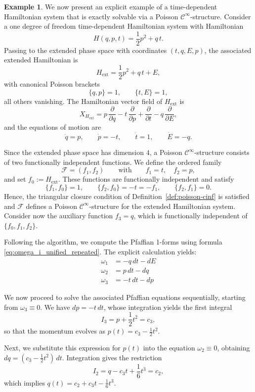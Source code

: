 \documentclass{article}
\theoremstyle{remark}
\theoremstyle{definition}
\newtheorem{example}{Example}[section]
\newcommand{\cinf}{$\mathcal{C}^{\infty}$}
\begin{document}
\begin{example}
We now present an explicit example of a time-dependent Hamiltonian
system that is exactly solvable via a Poisson \cinf-structure. Consider a one degree of freedom time-dependent Hamiltonian system with Hamiltonian
\[
H(q,p,t)=\frac{1}{2}p^2+q\,t.
\]
Passing to the extended phase space with coordinates $(t,q,E,p)$, the
associated extended Hamiltonian is
\[
H_{\mathrm{ext}}=\frac{1}{2}p^2+q\,t+E,
\]
with canonical Poisson brackets
\[
\{q,p\}=1,\qquad \{t,E\}=1,
\]
all others vanishing. The Hamiltonian vector field of $H_{\mathrm{ext}}$ is
\[
X_{H_{\mathrm{ext}}}
=
p\,\frac{\partial}{\partial q}
-
t\,\frac{\partial}{\partial p}
+
\frac{\partial}{\partial t}
-
q\,\frac{\partial}{\partial E},
\]
and the equations of motion are
\[
\dot q=p,\qquad
\dot p=-t,\qquad
\dot t=1,\qquad
\dot E=-q.
\]

Since the extended phase space has dimension $4$, a Poisson
\cinf-structure consists of two functionally independent functions.
We define the ordered family
\[
\mathcal F=(f_1,f_2)
\qquad\text{with}\qquad
f_1=t,\quad
f_2=p,
\]
and set $f_0:=H_{\mathrm{ext}}$. These functions are functionally independent and satisfy
\[
\{f_1,f_0\}=1,\qquad
\{f_2,f_0\}=-t=-f_1,\qquad
\{f_2,f_1\}=0.
\]
Hence, the triangular closure condition of
Definition~\ref{def:poisson-cinf} is satisfied and $\mathcal F$ defines a Poisson \cinf-structure for the extended Hamiltonian system. Consider now the auxiliary function $f_3=q$, which is functionally independent of $\{f_0,f_1,f_2\}$. 

Following the algorithm, we compute the Pfaffian 1-forms using formula \eqref{eq:omega_i_unified_repeated}. The explicit calculation yields:
\begin{align*}
    \omega_1 &= -q \, dt - dE \\
    \omega_2 &= p \, dt - dq \\
    \omega_3 &= -t \, dt - dp
\end{align*}

We now proceed to solve the associated Pfaffian equations sequentially, starting from $\omega_3 \equiv 0$. We have $dp = -t \, dt$, whose integration yields the first integral
\begin{equation}
    I_3 = p + \frac{1}{2}t^2 = c_3,
\end{equation}
so that the momentum evolves as $p(t) = c_3 - \frac{1}{2}t^2$. 

Next, we substitute this expression for $p(t)$ into the equation $\omega_2 \equiv 0$, obtaining $dq = (c_3 - \frac{1}{2}t^2) \, dt$. Integration gives the restriction
\begin{equation}
    I_2 = q - c_3 t + \frac{1}{6}t^3 = c_2,
\end{equation}
which implies $q(t) = c_2 + c_3 t - \frac{1}{6}t^3$. 


\end{example}
\end{document}
